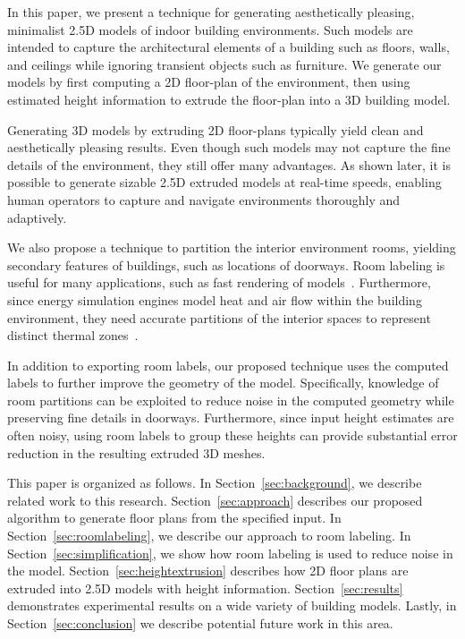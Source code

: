 \documentclass[a4paper,twoside]{article}
\begin{document}
In this paper, we present a technique for generating aesthetically pleasing, minimalist 2.5D models of indoor building environments.  Such models are intended to capture the architectural elements of a building such as floors, walls, and ceilings while ignoring transient objects such as furniture.  We generate our models by first computing a 2D floor-plan of the environment, then using estimated height information to extrude the floor-plan into a 3D building model.  

Generating 3D models by extruding 2D floor-plans typically yield clean and aesthetically pleasing results.  Even though such models may not capture the fine details of the environment, they still offer many advantages.  As shown later, it is possible to generate sizable 2.5D extruded models at real-time speeds, enabling human operators to capture and navigate environments thoroughly and adaptively.

We also propose a technique to partition the interior environment rooms, yielding secondary features of buildings, such as locations of doorways.  Room labeling is useful for many applications, such as fast rendering of models~\cite{WalkthroughRendering}.  Furthermore, since energy simulation engines model heat and air flow within the building environment, they need accurate partitions of the interior spaces to represent distinct thermal zones~\cite{EnergyPlus}.  

In addition to exporting room labels, our proposed technique uses the computed labels to further improve the geometry of the model.  Specifically, knowledge of room partitions can be exploited to reduce noise in the computed geometry while preserving fine details in doorways.  Furthermore, since input height estimates are often noisy, using room labels to group these heights can provide substantial error reduction in the resulting extruded 3D meshes.

This paper is organized as follows.  In Section~\ref{sec:background}, we describe related work to this research.  Section~\ref{sec:approach} describes our proposed algorithm to generate floor plans from the specified input.  In Section~\ref{sec:roomlabeling}, we describe our approach to room labeling. In Section~\ref{sec:simplification}, we show how room labeling is used to reduce noise in the model.  Section~\ref{sec:heightextrusion} describes how 2D floor plans are extruded into 2.5D models with height information.  Section~\ref{sec:results} demonstrates experimental results on a wide variety of building models.  Lastly, in Section~\ref{sec:conclusion} we describe potential future work in this area.
\end{document}
